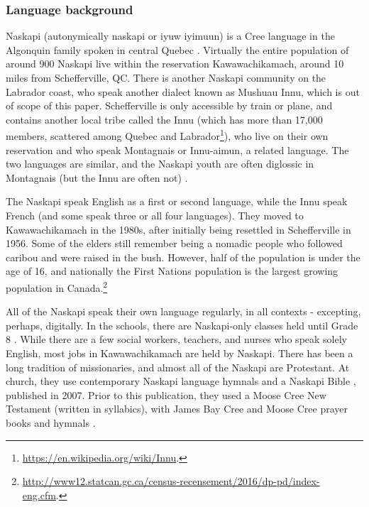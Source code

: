 \subsubsection{Language background}
\label{sec:naskapi-language-background}

Naskapi (autonymically  naskapi or  iyuw iyimuun) is a Cree language in the Algonquin family spoken in central Quebec \citep{MacKenzie-and-Jancewicz-1994}. Virtually the entire population of around 900 Naskapi live within the reservation Kawawachikamach, around 10 miles from Schefferville, QC. There is another Naskapi community on the Labrador coast, who speak another dialect known as Mushuau Innu, which is out of scope of this paper. Schefferville is only accessible by train or plane, and contains another local tribe called the Innu (which has more than 17,000 members, scattered among Quebec and Labrador\footnote{\href{https://en.wikipedia.org/wiki/Innu}{https://en.wikipedia.org/wiki/Innu}. }), who live on their own reservation and who speak Montagnais or Innu-aimun, a related language. The two languages are similar, and the Naskapi youth are often diglossic in Montagnais (but the Innu are often not) \citep{macKenzie1980towards}.

The Naskapi speak English as a first or second language, while the Innu speak French (and some speak three or all four languages). They moved to Kawawachikamach in the 1980s, after initially being resettled in Schefferville in 1956. Some of the elders still remember being a nomadic people who followed caribou and were raised in the bush. However, half of the population is under the age of 16, and nationally the First Nations population is the largest growing population in Canada.\footnote{\href{http://www12.statcan.gc.ca/census-recensement/2016/dp-pd/index-eng.cfm}{http://www12.statcan.gc.ca/census-recensement/2016/dp-pd/index-eng.cfm}. }

All of the Naskapi speak their own language regularly, in all contexts - excepting, perhaps, digitally. In the schools, there are Naskapi-only classes held until Grade 8 \citep{llewellyn2017oral}. While there are a few social workers, teachers, and nurses who speak solely English, most jobs in Kawawachikamach are held by Naskapi. There has been a long tradition of missionaries, and almost all of the Naskapi are Protestant. At church, they use contemporary Naskapi language hymnals and a Naskapi Bible \citep{naskapi-new-testament}, published in 2007. Prior to this publication, they used a Moose Cree New Testament (written in syllabics), with James Bay Cree and Moose Cree prayer books and hymnals \citep{jancewicz2013grammar}.

